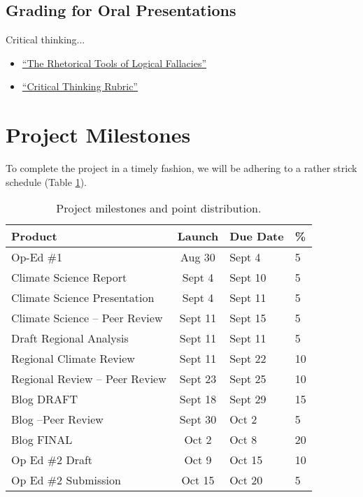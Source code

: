 \documentclass{article}\usepackage[]{graphicx}\usepackage[]{color}
\begin{document}
\subsection{Grading for Oral Presentations}


Critical thinking...

\begin{itemize}
  \item \href{https://github.com/marclos/Climate_Change_Narratives/raw/master/Writing_Resources/Logical_Fallacies.pdf}{``The Rhetorical Tools of Logical Fallacies''}
  \item \href{https://github.com/marclos/Climate_Change_Narratives/raw/master/Writing_Resources/Critical_Thinking.pdf}{``Critical Thinking Rubric''}
\end{itemize}




\section{Project Milestones}

To complete the project in a timely fashion, we will be adhering to a rather strick schedule (Table \ref{tab:milestones}).

\begin{table}[h]

\caption{Project milestones and point distribution.}\label{tab:milestones}
\begin{tabular}{lcll}\hline
Product                     & Launch    & Due Date  & \% \\\hline\hline
Op-Ed \#1                   & Aug 30    & Sept 4    & 5 \\
Climate Science Report      & Sept 4    & Sept 10   & 5 \\
Climate Science Presentation& Sept 4    & Sept 11   & 5 \\
Climate Science -- Peer Review  & Sept 11 & Sept 15 & 5 \\
Draft Regional Analysis     & Sept 11   & Sept 11   & 5 \\
Regional Climate Review     & Sept 11   & Sept 22   & 10 \\
Regional Review -- Peer Review & Sept 23   & Sept 25 & 10 \\
Blog DRAFT                  & Sept 18   & Sept 29    & 15 \\
Blog --Peer Review          & Sept 30   & Oct 2     & 5\\
Blog FINAL                  & Oct 2     & Oct 8    & 20 \\
Op Ed \#2 Draft             & Oct 9     & Oct 15    & 10 \\
Op Ed \#2 Submission        & Oct 15    & Oct 20    & 5 \\ \hline
\end{tabular}
\end{table}
\end{document}
